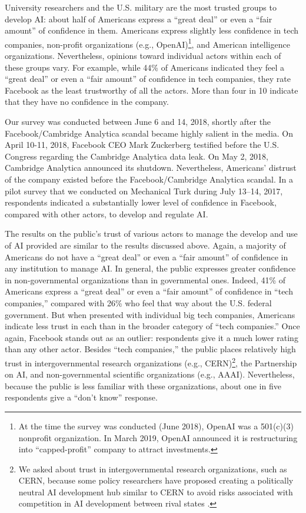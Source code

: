 \documentclass{article}
\begin{document}
University researchers and the U.S. military are the most trusted groups to develop AI: about half of Americans express a ``great deal'' or even a ``fair amount'' of confidence in them. Americans express slightly less confidence in tech companies, non-profit organizations (e.g., OpenAI)\footnote{At the time the survey was conducted (June 2018), OpenAI was a 501(c)(3) nonprofit organization. In March 2019, OpenAI announced it is restructuring into ``capped-profit'' company to attract investments.}, and American intelligence organizations. Nevertheless, opinions toward individual actors within each of these groups vary. For example, while 44\% of Americans indicated they feel a ``great deal'' or even a ``fair amount'' of confidence in tech companies, they rate Facebook as the least trustworthy of all the actors. More than four in 10 indicate that they have no confidence in the company.

Our survey was conducted between June 6 and 14, 2018, shortly after the Facebook/Cambridge Analytica scandal became highly salient in the media. On April 10-11, 2018, Facebook CEO Mark Zuckerberg testified before the U.S. Congress regarding the Cambridge Analytica data leak. On May 2, 2018, Cambridge Analytica announced its shutdown. Nevertheless, Americans' distrust of the company existed before the Facebook/Cambridge Analytica scandal. In a pilot survey that we conducted on Mechanical Turk during July 13--14, 2017, respondents indicated a substantially lower level of confidence in Facebook, compared with other actors, to develop and regulate AI.

The results on the public's trust of various actors to manage the develop and use of AI provided are similar to the results discussed above. Again, a majority of Americans do not have a ``great deal'' or even a ``fair amount'' of confidence in any institution to manage AI. In general, the public expresses greater confidence in non-governmental organizations than in governmental ones. Indeed, 41\% of Americans express a ``great deal'' or even a ``fair amount'' of confidence in ``tech companies,'' compared with 26\% who feel that way about the U.S. federal government. But when presented with individual big tech companies, Americans indicate less trust in each than in the broader category of ``tech companies.'' Once again, Facebook stands out as an outlier: respondents give it a much lower rating than any other actor. Besides ``tech companies,'' the public places relatively high trust in intergovernmental research organizations (e.g., CERN)\footnote{We asked about trust in intergovernmental research organizations, such as CERN, because some policy researchers have proposed creating a politically neutral AI development hub similar to CERN to avoid risks associated with competition in AI development between rival states \citep{politicallyneutral2019}.}, the Partnership on AI, and non-governmental scientific organizations (e.g., AAAI). Nevertheless, because the public is less familiar with these organizations, about one in five respondents give a ``don't know'' response.
\end{document}
